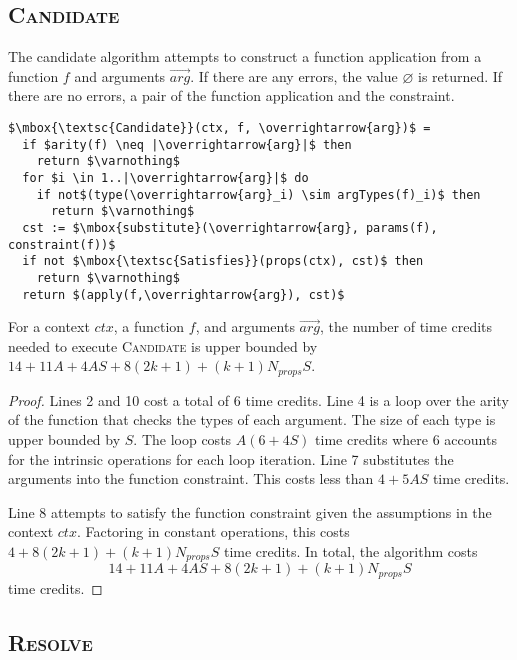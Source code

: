 \subsection{\textsc{Candidate}}

The candidate algorithm attempts to construct a function application from a function $f$ and arguments $\overrightarrow{arg}$. If there are any errors, the value $\varnothing$ is returned. If there are no errors, a pair of the function application and the constraint.
  \begin{center}
    \begin{lstlisting}[style=numberedalgo, mathescape]
$\mbox{\textsc{Candidate}}(ctx, f, \overrightarrow{arg})$ =
  if $arity(f) \neq |\overrightarrow{arg}|$ then
    return $\varnothing$
  for $i \in 1..|\overrightarrow{arg}|$ do
    if not$(type(\overrightarrow{arg}_i) \sim argTypes(f)_i)$ then
      return $\varnothing$
  cst := $\mbox{substitute}(\overrightarrow{arg}, params(f), constraint(f))$
  if not $\mbox{\textsc{Satisfies}}(props(ctx), cst)$ then
    return $\varnothing$
  return $(apply(f,\overrightarrow{arg}), cst)$
    \end{lstlisting}
  \end{center}

\begin{theorem}
  \label{thm:candidate_time_complexity}
  For a context $ctx$, a function $f$, and arguments $\overrightarrow{arg}$, the number of time credits needed to execute \textsc{Candidate} is upper bounded by $14 + 11A + 4AS + 8(2k+1) + (k+1)N_{props}S$.
\end{theorem}
  \begin{proof}
    Lines 2 and 10 cost a total of 6 time credits. Line 4 is a loop over the arity of the function that checks the types of each argument. The size of each type is upper bounded by $S$. The loop costs $A(6 + 4S)$ time credits where 6 accounts for the intrinsic operations for each loop iteration. Line 7 substitutes the arguments into the function constraint. This costs less than $4 + 5 A S$ time credits.

    Line 8 attempts to satisfy the function constraint given the assumptions in the context $ctx$. Factoring in constant operations, this costs $4 + 8(2k+1) + (k+1)N_{props}S$ time credits. In total, the algorithm costs
    $$
      14 + 11A + 4AS + 8(2k+1) + (k+1)N_{props}S 
    $$
    time credits.
  \end{proof}

\subsection{\textsc{Resolve}}
\label{subsec:algos.resolve}

